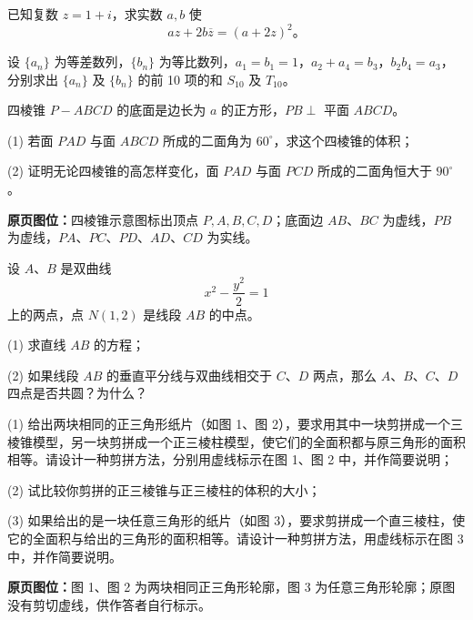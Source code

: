\begin{question}
已知复数 $z=1+i$，求实数 $a,b$ 使
\nopagebreak[4]
\[az+2b\overline{z}=(a+2z)^2\text{。}\]

\end{question}
\begin{question}
设 $\{a_n\}$ 为等差数列，$\{b_n\}$ 为等比数列，$a_1=b_1=1$，$a_2+a_4=b_3$，$b_2b_4=a_3$，分别求出 $\{a_n\}$ 及 $\{b_n\}$ 的前 10 项的和 $S_{10}$ 及 $T_{10}$。

\Needspace{0.4\textheight}
\end{question}
\begin{question}
四棱锥 $P-ABCD$ 的底面是边长为 $a$ 的正方形，$PB\perp$ 平面 $ABCD$。

(1) 若面 $PAD$ 与面 $ABCD$ 所成的二面角为 $60^\circ$，求这个四棱锥的体积；

(2) 证明无论四棱锥的高怎样变化，面 $PAD$ 与面 $PCD$ 所成的二面角恒大于 $90^\circ$。

\textbf{原页图位：}四棱锥示意图标出顶点 $P,A,B,C,D$；底面边 $AB$、$BC$ 为虚线，$PB$ 为虚线，$PA$、$PC$、$PD$、$AD$、$CD$ 为实线。
\nopagebreak[4]
\begin{center}\end{center}
\nopagebreak[4]
\end{question}
\begin{question}
设 $A\text{、}B$ 是双曲线
\nopagebreak[4]
\[
x^2-\frac{y^2}{2}=1
\]
上的两点，点 $N(1,2)$ 是线段 $AB$ 的中点。

(1) 求直线 $AB$ 的方程；

(2) 如果线段 $AB$ 的垂直平分线与双曲线相交于 $C\text{、}D$ 两点，那么 $A\text{、}B\text{、}C\text{、}D$ 四点是否共圆？为什么？

\Needspace{0.4\textheight}
\end{question}
\begin{question}
(1) 给出两块相同的正三角形纸片（如图 1、图 2），要求用其中一块剪拼成一个三棱锥模型，另一块剪拼成一个正三棱柱模型，使它们的全面积都与原三角形的面积相等。请设计一种剪拼方法，分别用虚线标示在图 1、图 2 中，并作简要说明；

(2) 试比较你剪拼的正三棱锥与正三棱柱的体积的大小；

(3) 如果给出的是一块任意三角形的纸片（如图 3），要求剪拼成一个直三棱柱，使它的全面积与给出的三角形的面积相等。请设计一种剪拼方法，用虚线标示在图 3 中，并作简要说明。

\textbf{原页图位：}图 1、图 2 为两块相同正三角形轮廓，图 3 为任意三角形轮廓；原图没有剪切虚线，供作答者自行标示。
\nopagebreak[4]
\begin{center}\end{center}
\nopagebreak[4]
\end{question}
